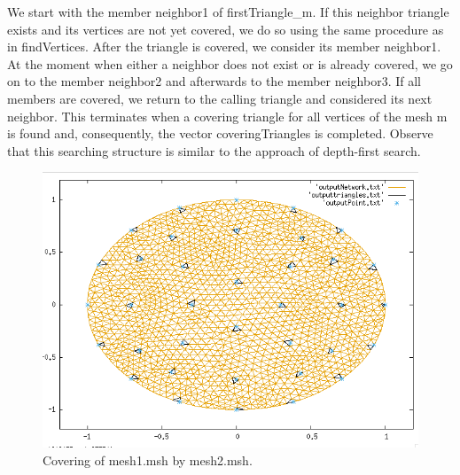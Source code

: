 \documentclass[10pt]{article}
\begin{document}
We start with the member {\ttfamily neighbor1} of {\ttfamily firstTriangle\_m}. If this neighbor triangle exists and its vertices are not yet covered, we do so using the same procedure as in {\ttfamily findVertices}. After the triangle is covered, we consider its member {\ttfamily neighbor1}. At the moment when either a neighbor does not exist or is already covered, we go on to the member {\ttfamily neighbor2} and afterwards to the member {\ttfamily neighbor3}. If all members are covered, we return to the calling triangle and considered its next neighbor. This terminates when a covering triangle for all vertices of the mesh {\ttfamily m} is found and, consequently, the vector {\ttfamily coveringTriangles} is completed. Observe that this searching structure is similar to the approach of depth-first search.

\begin{figure}
	\includegraphics[width=0.55\linewidth,height=0.55\linewidth]{../Figures/CoveringTriangles.png}
	\caption{Covering of mesh1.msh by mesh2.msh.}
\end{figure}
\end{document}
